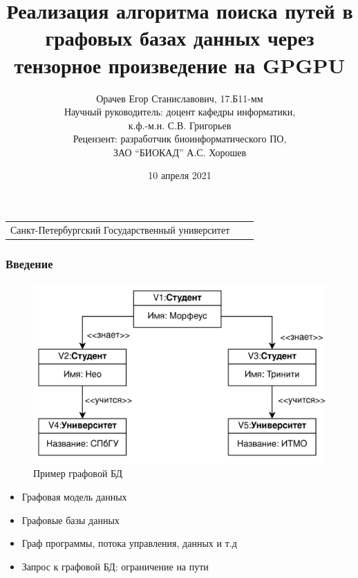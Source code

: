 \documentclass[xcolor=table,english]{beamer}
\title[Tensor CFPQ GPGPU]{Реализация алгоритма поиска путей в графовых базах данных через тензорное произведение на GPGPU}
\institute[СПбГУ]{
Программная инженерия
}
\author[Егор Орачев]{Орачев Егор Станиславович, 17.Б11-мм \\Научный руководитель: доцент кафедры информатики,\\ к.ф.-м.н. С.В. Григорьев\\Рецензент: разработчик биоинформатического ПО,\\ ЗАО “БИОКАД” А.С. Хорошев}
\date{10 апреля 2021}
\begin{document}
{
\begin{frame}[fragile]
  \begin{table}
  \centering
  \begin{tabularx}{\linewidth}{YcX}
    \begin{minipage}[t]{1.0\textwidth}\center 
    Санкт-Петербургский Государственный университет
      \end{minipage}
  \end{tabularx}
  \end{table}
  \titlepage
\end{frame}
}

\begin{frame}[fragile] \frametitle{Введение}
    \begin{minipage}[m]{0.5\linewidth}
        \begin{figure}
            \centering
            \includegraphics[width=\textwidth]{figures/db_example.png}
            \caption{Пример графовой БД}
            \label{fig:architecture}
        \end{figure}
    \end{minipage}\hfill
    \begin{minipage}[m]{0.5\linewidth}
        \begin{itemize}
            \item Графовая модель данных
            \item Графовые базы данных
            \item Граф программы, потока управления, данных и т.д
            \item Запрос к графовой БД: ограничение на пути
        \end{itemize}
    \end{minipage}
\end{frame}
\end{document}
